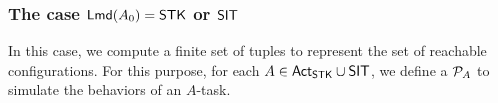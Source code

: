 

\subsubsection{The case ${\sf Lmd}(A_0) = \mathsf{STK}$ or $\mathsf{SIT}$}\label{sec:amass-stk}

In this case, we compute a finite set of {\WOTrNFA} tuples to represent the set of reachable configurations.
For this purpose, for each $A \in {\sf Act}_{\sf STK} \cup {\sf SIT}$, we define a {\WOTrPDS} ${\mathcal{P} }_A$ to simulate the behaviors of an $A$-task. 

